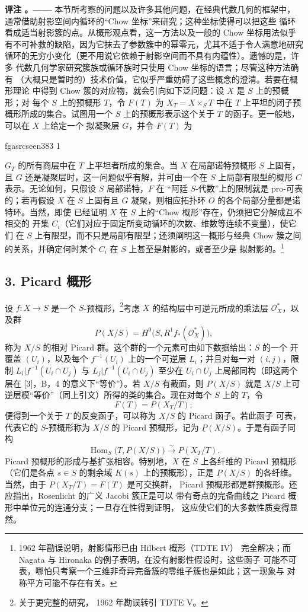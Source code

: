 \documentclass[12pt,twoside,openany]{book}
\numberwithin{equation}{section}
\newcommand{\fgaunitid}{unbound}
\newcommand{\src}[1]{%
  \phantomsection
  \hypertarget{src:\fgaunitid:#1}{}%
  \hypertarget{fga.\fgaunitid.p#1}{}%
  \ifcsname fgasrcseen#1\endcsname\else
    \expandafter\gdef\csname fgasrcseen#1\endcsname{1}%
    \hypertarget{src:#1}{}%
  \fi
  \marginpar{\raggedleft\footnotesize\sffamily #1}%
}
\newcommand{\fquote}[1]{“#1”}
\theoremstyle{plain}
\theoremstyle{definition}
\theoremstyle{remark}
\newcommand{\result}[2]{%
  \par\medskip\noindent\textbf{#1%
  \if\relax\detokenize{#2}\relax\else\space#2\fi。——}\enspace
}
\begin{document}
\result{评注}{} 本节所考察的问题以及许多其他问题，在经典代数几何的框架中，
通常借助射影空间内循环的\fquote{Chow 坐标}来研究；这种坐标使得可以把这些
循环看成适当射影簇的点。从概形观点看，这一方法以及一般的 Chow 坐标用法似乎
有不可补救的缺陷，因为它抹去了参数簇中的幂零元，尤其不适于令人满意地研究
循环的无穷小变化（更不用说它依赖于射影空间而不具有内蕴性）。遗憾的是，许多
代数几何学家研究簇族或循环族时只使用 Chow 坐标的语言；尽管这种方法确有
（大概只是暂时的）技术价值，它似乎严重妨碍了这些概念的澄清。若要在概形理论
中得到 Chow 簇的对应物，就会引向如下泛问题：设 $X$ 是 $S$ 上的预概形；对
每个 $S$ 上的预概形 $T$，令 $F(T)$ 为
$X_T=X\times_ST$ 中在 $T$ 上平坦的闭子预概形所成的集合。试图用一个
$S$ 上的预概形表示这个关于 $T$ 的函子。更一般地，可以在 $X$ 上给定一个
拟凝聚层 $G$，并令 $F(T)$ 为

\src{383}
$G_T$ 的所有商层中在 $T$ 上平坦者所成的集合。当 $X$ 在局部诺特预概形
$S$ 上固有，且
$G$ 还是凝聚层时，这一问题似乎有解，并可由一个在 $S$ 上局部有限型的概形
$C$ 表示。无论如何，只假设 $S$ 局部诺特，$F$ 在
\fquote{阿廷 $S$-代数}上的限制就是 pro-可表的；若再假设 $X$ 在 $S$
上固有且 $G$ 凝聚，则相应拓扑环 $O$ 的各个局部分量都是诺特环。当然，即使
已经证明 $X$ 在 $S$ 上的\fquote{Chow 概形}存在，仍须把它分解成互不相交的
开集 $C_i$（它们对应于固定所变动循环的次数、维数等连续不变量），使它们
在 $S$ 上有限型，而不只是局部有限型；还须阐明这一概形与经典 Chow
簇之间的关系，并确定何时某个 $C_i$ 在 $S$ 上甚至是射影的，或者至少是
拟射影的。\footnote{1962 年勘误说明，射影情形已由 Hilbert 概形（TDTE IV）
完全解决；而 Nagata 与 Hironaka 的例子表明，在没有射影性假设时，这些函子
可能不可表，哪怕只考察一个三维非奇异完备簇的零维子簇也是如此；这一现象与
对称平方可能不存在有关。}

\subsection*{3. Picard 概形}

设 $f:X\longrightarrow S$ 是一个 $S$-预概形，\footnote{关于更完整的研究，
1962 年勘误转引 TDTE V。}考虑 $X$ 的结构层中可逆元所成的乘法层
$\mathcal O_X^*$，以及群
\[
  P(X/S)=H^0\bigl(S,R^1f_*(\mathcal O_X^*)\bigr),
\]
称为 $X/S$ 的相对 Picard 群。这个群的一个元素可由如下数据给出：$S$ 的一个
开覆盖 $(U_i)$，以及每个 $f^{-1}(U_i)$ 上的一个可逆层 $L_i$；并且对每一对
$(i,j)$，限制 $L_i|f^{-1}(U_i\cap U_j)$ 与
$L_j|f^{-1}(U_i\cap U_j)$ 至少在 $U_i\cap U_j$ 上局部同构（即这两个层在
[3]，B，4 的意义下\fquote{等价}）。若 $X/S$ 有截面，则 $P(X/S)$ 就是
$X/S$ 上可逆层模\fquote{等价}（同上引文）所得的类的集合。现在对每个
$S$ 上的 $T$，令
\[
  F(T)=P(X_T/T) ;
\]
便得到一个关于 $T$ 的反变函子，可以称为 $X/S$ 的 Picard 函子。若此函子
可表，代表它的 $S$-预概形称为 $X/S$ 的 Picard 预概形，记为
$\underline P(X/S)$。于是有函子同构
\[
  \operatorname{Hom}_S\bigl(T,\underline P(X/S)\bigr)
  \xrightarrow{\sim}P(X_T/T).
\]
Picard 预概形的形成与基扩张相容。特别地，$X$ 在 $S$ 上各纤维的 Picard
预概形（它们是各点 $s\in S$ 的剩余域 $K(s)$ 上的预概形），正是
$\underline P(X/S)$ 的各纤维。当然，由于 $P(X_T/T)=F(T)$ 是可交换群，
Picard 预概形都是群预概形。还应指出，Rosenlicht 的广义 Jacobi 簇正是可以
带有奇点的完备曲线之 Picard 概形中单位元的连通分支；一旦存在性得到证明，
这应使它们的大多数性质变得显然。
\end{document}
